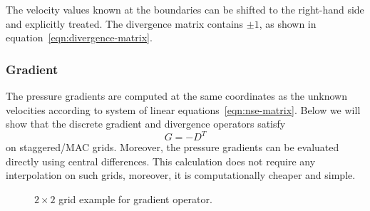 \documentclass{article}
\begin{document}
 

The velocity values known at the boundaries can be shifted to the right-hand side and explicitly treated. The divergence matrix contains $\pm1$, as shown in equation~\eqref{eqn:divergence-matrix}.


\subsubsection{Gradient}\label{subsec:gradient} 

The pressure gradients are computed at the same coordinates as the unknown velocities according to system of linear equations~\eqref{eqn:nse-matrix}. Below we will show that the discrete gradient and divergence operators satisfy
\begin{equation}\label{eqn:g-dt}
  {G}=-{D^T}
\end{equation}
on staggered/MAC grids. Moreover, the pressure gradients can be evaluated directly using central differences. This calculation does not require any interpolation on such grids, moreover, it is computationally cheaper and simple.

\begin{figure}[H] %
  \caption{$2\times 2$ grid example for gradient operator.}\label{fig:G-example-2x2}
\end{figure}
\end{document}
